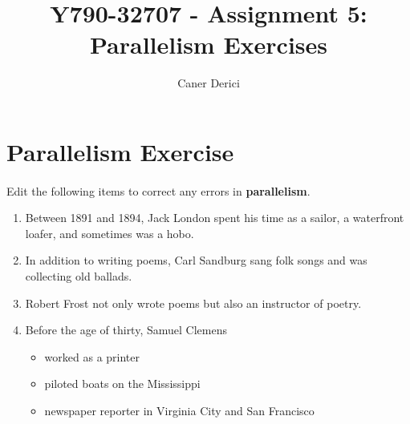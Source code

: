\documentclass{article}
\title{Y790-32707 - Assignment 5: Parallelism Exercises}
\author{}
\date{Caner Derici}
\begin{document}

\maketitle%

\section{Parallelism Exercise}

\paragraph{} Edit the following items to correct any errors in \textbf{parallelism}.

\begin{enumerate}
  \item Between 1891 and 1894, Jack London spent his time as a sailor,
    a waterfront loafer, and sometimes was a hobo.
    
  \item In addition to writing poems, Carl Sandburg sang folk songs
    and was collecting old ballads.

  \item Robert Frost not only wrote poems but also an instructor of
    poetry.

  \item Before the age of thirty, Samuel Clemens
    \begin{itemize}
    \item worked as a printer
    \item piloted boats on the Mississippi
    \item newspaper reporter in Virginia City and San Francisco
    \end{itemize}

      

\end{enumerate}
\end{document}
